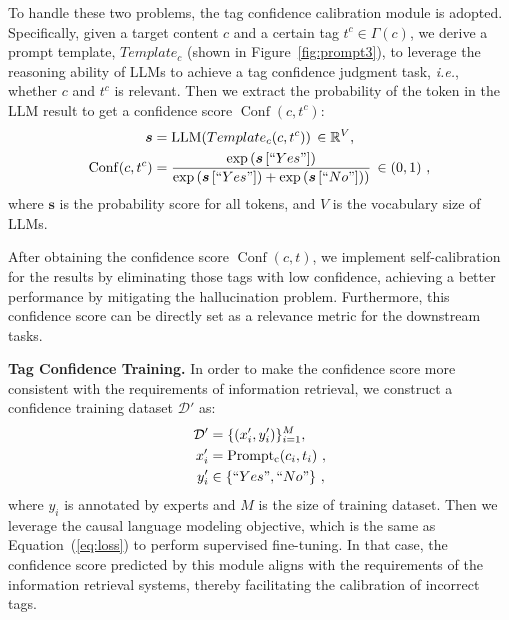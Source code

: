 To handle these two problems, the tag confidence calibration module is adopted. Specifically, given a target content $c$ and a certain tag $t^c \in \Gamma(c)$, we derive a prompt template, ${Template_c}$ (shown in Figure~\ref{fig:prompt3}), to leverage the reasoning ability of LLMs to achieve a tag confidence judgment task, \textit{i.e.}, whether $c$ and $t^c$ is relevant. Then we extract the probability of the token in the LLM result to get a confidence score $\operatorname{Conf}(c, t^c)$:
\begin{equation}
\begin{aligned}
    \boldsymbol{s} &= \operatorname{LLM}({Template_c}(c, t^c))\,\in\mathbb{R}^{V}, \\
    \operatorname{Conf}(c, t^c) &= \frac{\exp\left(\boldsymbol{s}\left[``Yes"\right]\right)}{\exp\left(\boldsymbol{s}\left[``Yes"\right]\right)+\exp\left(\boldsymbol{s}\left[``No"\right])\right)} \,\in(0,1)~,
\end{aligned}
\end{equation} 
where $\boldsymbol{s}$ is the probability score for all tokens, and $V$ is the vocabulary size of LLMs.

After obtaining the confidence score $\operatorname{Conf}(c, t)$, we implement self-calibration for the results by eliminating those tags with low confidence, achieving a better performance by mitigating the hallucination problem. Furthermore, this confidence score can be directly set as a relevance metric for the downstream tasks. 

\textbf{Tag Confidence Training.}
In order to make the confidence score more consistent with the requirements of information retrieval, we construct a confidence training dataset $\mathcal{D}'$ as:
\begin{equation}
\begin{aligned}
    \mathcal{D}' &= \{(x_i', y_i')\}_{i=1}^M,\\
    x_i' &= \operatorname{Prompt_c}(c_i, t_i)~,\\
    y_i' &\in \{``Yes", ``No"\}~,
\end{aligned}
\end{equation}
where $y_i$ is annotated by experts and $M$ is the size of training dataset. Then we leverage the causal language modeling objective, which is the same as Equation~(\ref{eq:loss}) to perform supervised fine-tuning. In that case, the confidence score predicted by this module aligns with the requirements of the information retrieval systems, thereby facilitating the calibration of incorrect tags.


